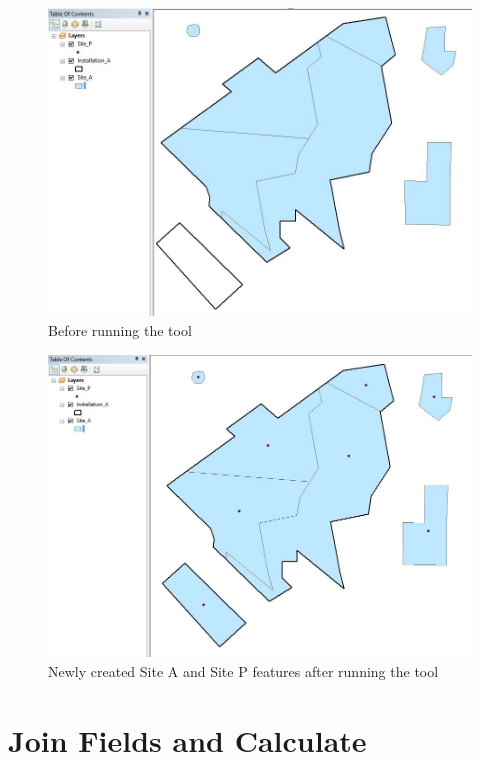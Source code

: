 \documentclass[openany]{book}
\theoremstyle{definition}
\theoremstyle{definition}
\theoremstyle{definition}
\theoremstyle{remark}
\begin{document}
\begin{figure}[H]

{\centering \includegraphics[width=4.74in,]{figures/csd-before} 

}

\caption{Before running the tool}\label{fig:csdbefore}
\end{figure}\begin{figure}[H]

{\centering \includegraphics[width=4.9in,]{figures/csd-after} 

}

\caption{Newly created Site A and Site P features after running the tool}\label{fig:csdafter}
\end{figure}

\hypertarget{joinCalc}{\chapter{Join Fields and
Calculate}\label{joinCalc}}
\end{document}
